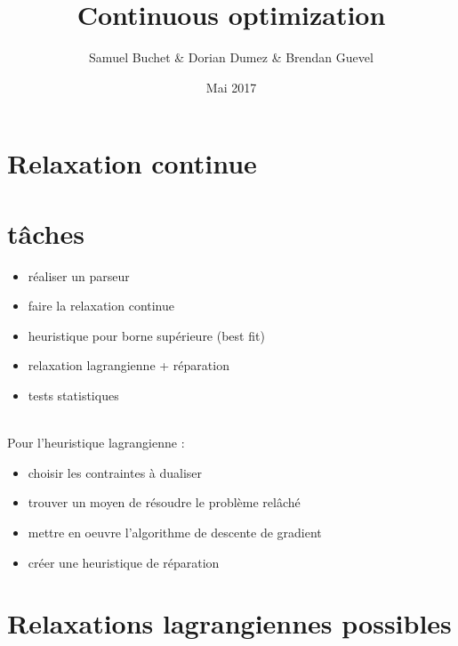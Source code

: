\documentclass{article}
\title{Continuous optimization}
\author{Samuel Buchet \& Dorian Dumez \& Brendan Guevel}
\date{Mai 2017}
\begin{document}
\maketitle

\section{Relaxation continue}

\section{tâches}

\begin{itemize}
    \item réaliser un parseur
    \item faire la relaxation continue
    \item heuristique pour borne supérieure (best fit)
    \item relaxation lagrangienne + réparation
    \item tests statistiques
\end{itemize}
~\\
Pour l'heuristique lagrangienne :
\begin{itemize}
    \item choisir les contraintes à dualiser
    \item trouver un moyen de résoudre le problème relâché
    \item mettre en oeuvre l'algorithme de descente de gradient
    \item créer une heuristique de réparation
\end{itemize}

\section{Relaxations lagrangiennes possibles}
\end{document}
